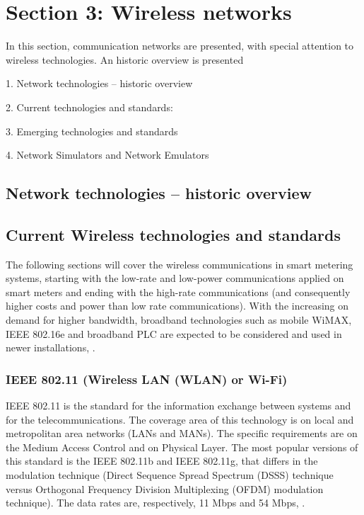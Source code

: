 



\section{Section 3: Wireless networks}

In this section, communication networks are presented, with special attention to wireless technologies. An historic overview is presented 



1.	Network technologies – historic overview

2.	Current technologies and standards:

3.	Emerging technologies and standards

4.	Network Simulators and Network Emulators






\subsection{Network technologies – historic overview}


\subsection{Current Wireless technologies and standards}

The following sections will cover the wireless communications in smart metering systems, starting with the low-rate and low-power communications applied on smart meters and ending with the high-rate communications (and consequently higher costs and power than low rate communications). With the increasing on demand for higher bandwidth, broadband technologies such as mobile WiMAX, IEEE 802.16e and broadband PLC are expected to be considered and used in newer installations, \cite{Mohassel2014}.



\subsubsection{IEEE 802.11 (Wireless LAN (WLAN) or Wi-Fi)}

IEEE 802.11 is the standard for the information exchange between systems and for the telecommunications. The coverage area of this technology is on local and metropolitan area networks (LANs and MANs). The specific requirements are on the Medium Access Control and on Physical Layer. The most popular versions of this standard is the IEEE 802.11b and IEEE 802.11g, that differs in the modulation technique (Direct Sequence Spread Spectrum (DSSS) technique versus Orthogonal Frequency Division Multiplexing (OFDM) modulation technique). The data rates are, respectively, 11 Mbps and 54 Mbps, \cite{Usman2013, ieee2012}.



